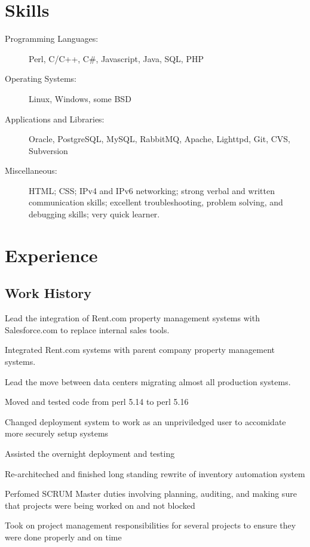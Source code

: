 \documentclass[table,tmargin=1in,bmargin=1in,letterpaper]{resume}
\author{Ryan Voots}
\begin{document}
\maketitle
\vspace{0.1in}

\section{Skills}
\begin{description}
\item[Programming Languages:]
Perl, C/C++, C\#, Javascript, Java, SQL, PHP
\item[Operating Systems:]
Linux, Windows, some BSD
\item[Applications and Libraries:]
Oracle, PostgreSQL, MySQL, RabbitMQ, Apache, Lighttpd, Git, CVS, Subversion
\item[Miscellaneous:]
HTML; CSS; IPv4 and IPv6 networking; strong verbal and written communication skills; excellent troubleshooting, problem solving, and debugging skills; very quick learner.
\end{description}

\section{Experience}

\subsection{Work History}

\begin{compactitem}
\item Lead the integration of Rent.com property management systems with Salesforce.com to replace internal sales tools.
\item Integrated Rent.com systems with parent company property management systems.
\item Lead the move between data centers migrating almost all production systems.
  \begin{compactitem}
  \item Moved and tested code from perl 5.14 to perl 5.16
  \item Changed deployment system to work as an unpriviledged user to accomidate more securely setup systems
  \item Assisted the overnight deployment and testing
  \end{compactitem}
\item Re-architeched and finished long standing rewrite of inventory automation system
\item Perfomed SCRUM Master duties involving planning, auditing, and making sure that projects were being worked on and not blocked
\item Took on project management responsibilities for several projects to ensure they were done properly and on time
\end{compactitem}
\end{document}
